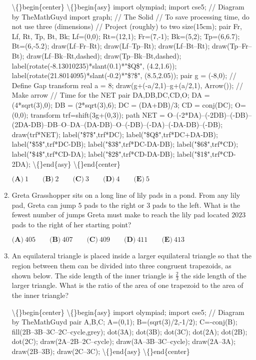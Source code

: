 \documentclass{article}
\begin{document}
\begin{enumerate}[label=\arabic*., itemsep=0.5em]
\textbackslash\{\}begin\{center\}
\textbackslash\{\}begin\{asy\}
import olympiad;
import cse5;
// Diagram by TheMathGuyd
import graph;
// The Solid
// To save processing time, do not use three (dimensions)
// Project (roughly) to two
size(15cm);
pair Fr, Lf, Rt, Tp, Bt, Bk;
Lf=(0,0);
Rt=(12,1);
Fr=(7,-1);
Bk=(5,2);
Tp=(6,6.7);
Bt=(6,-5.2);
draw(Lf--Fr--Rt);
draw(Lf--Tp--Rt);
draw(Lf--Bt--Rt);
draw(Tp--Fr--Bt);
draw(Lf--Bk--Rt,dashed);
draw(Tp--Bk--Bt,dashed);
label(rotate(-8.13010235)*slant(0.1)*"\$Q\$", (4.2,1.6));
label(rotate(21.8014095)*slant(-0.2)*"\$?\$", (8.5,2.05));
pair g = (-8,0); // Define Gap transform
real a = 8;
draw(g+(-a/2,1)--g+(a/2,1), Arrow()); // Make arrow
// Time for the NET
pair DA,DB,DC,CD,O;
DA = (4*sqrt(3),0);
DB = (2*sqrt(3),6);
DC = (DA+DB)/3;
CD = conj(DC);
O=(0,0);
transform trf=shift(3g+(0,3));
path NET = O--(-2*DA)--(-2DB)--(-DB)--(2DA-DB)--DB--O--DA--(DA-DB)--O--(-DB)--(-DA)--(-DA-DB)--(-DB);
draw(trf*NET);
label("\$7\$",trf*DC);
label("\$Q\$",trf*DC+DA-DB);
label("\$5\$",trf*DC-DB);
label("\$3\$",trf*DC-DA-DB);
label("\$6\$",trf*CD);
label("\$4\$",trf*CD-DA);
label("\$2\$",trf*CD-DA-DB);
label("\$1\$",trf*CD-2DA);
\textbackslash\{\}end\{asy\}
\textbackslash\{\}end\{center\}


\(\textbf{(A)}\ 1 \qquad \textbf{(B)}\ 2 \qquad \textbf{(C)}\ 3 \qquad \textbf{(D)}\ 4 \qquad \textbf{(E)}\ 5\)\par \vspace{0.5em}\item Greta Grasshopper sits on a long line of lily pads in a pond. From any lily pad, Greta can jump \(5\) pads to the right or \(3\) pads to the left. What is the fewest number of jumps Greta must make to reach the lily pad located \(2023\) pads to the right of her starting point?

\(\textbf{(A)}\ 405 \qquad \textbf{(B)}\ 407 \qquad \textbf{(C)}\ 409 \qquad \textbf{(D)}\ 411 \qquad \textbf{(E)}\ 413\)\par \vspace{0.5em}\item An equilateral triangle is placed inside a larger equilateral triangle so that the region between them can be divided into three congruent trapezoids, as shown below. The side length of the inner triangle is \(\frac23\) the side length of the larger triangle. What is the ratio of the area of one trapezoid to the area of the inner triangle?


\textbackslash\{\}begin\{center\}
\textbackslash\{\}begin\{asy\}
import olympiad;
import cse5;
// Diagram by TheMathGuyd 
pair A,B,C;
A=(0,1);
B=(sqrt(3)/2,-1/2);
C=-conj(B);
fill(2B--3B--3C--2C--cycle,grey);
dot(3A);
dot(3B);
dot(3C);
dot(2A);
dot(2B);
dot(2C);
draw(2A--2B--2C--cycle);
draw(3A--3B--3C--cycle);
draw(2A--3A);
draw(2B--3B);
draw(2C--3C);
\textbackslash\{\}end\{asy\}
\textbackslash\{\}end\{center\}



\end{enumerate}
\end{document}
